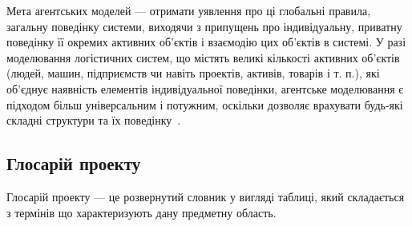 Мета агентських моделей --- отримати уявлення про ці глобальні правила, загальну поведінку системи, виходячи з припущень про індивідуальну, приватну поведінку її окремих активних об'єктів і взаємодію цих об'єктів в системі.
У разі моделювання логістичних систем, що містять великі кількості активних об'єктів (людей, машин, підприємств чи навіть проектів, активів, товарів і т. п.), які об'єднує наявність елементів індивідуальної поведінки, агентське моделювання є підходом більш універсальним і потужним, оскільки дозволяє врахувати будь-які складні структури та їх поведінку~\cite{Shamrin2016}. 

\subsection{Глосарій проекту}
Глосарій проекту --- це розвернутий словник у вигляді таблиці, який складається з термінів що характеризують дану предметну область.

